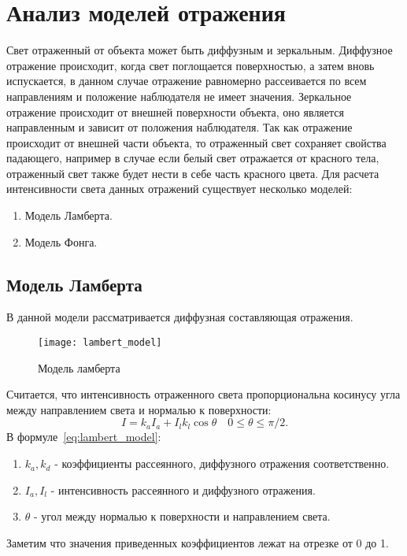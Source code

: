 \section[Анализ моделей отражения]{Анализ моделей отражения}
\label{sec:reflection_models}
Свет отраженный от объекта может быть диффузным и зеркальным.
Диффузное отражение происходит, когда свет поглощается поверхностью, а затем вновь испускается, в данном случае
отражение равномерно рассеивается по всем направлениям и положение наблюдателя не имеет значения. Зеркальное отражение
происходит от внешней поверхности объекта, оно является направленным и зависит от положения наблюдателя.
Так как отражение происходит от внешней части объекта, то отраженный свет сохраняет свойства падающего, например в случае если белый свет отражается
от красного тела, отраженный свет также будет нести в себе часть красного цвета.
Для расчета интенсивности света данных отражений существует несколько моделей:
\begin{enumerate}
	\item Модель Ламберта.
	\item Модель Фонга.\cite{Rodgers}
\end{enumerate}

\subsection{Модель Ламберта}
В данной модели рассматривается диффузная составляющая отражения.

\begin{figure}[h]
	\centering
	\texttt{[image: lambert\_model]}
	\caption{Модель ламберта}
	\label{fig:lambert_model}
\end{figure}

Считается, что интенсивность отраженного света
пропорциональна косинусу угла между направлением света и нормалью к поверхности:
\begin{equation} 
	I = k_aI_a + I_lk_l\cos\theta \quad 0 \leq \theta \leq \pi/2.
	\label{eq:lambert_model}
\end{equation}
В  формуле~\ref{eq:lambert_model}:
\begin{enumerate}
	\item $k_a,k_d$ - коэффициенты рассеянного, диффузного отражения соответственно.
	\item $I_a,I_l$ - интенсивность рассеянного и диффузного отражения.
	\item $\theta$ - угол между нормалью к поверхности и направлением света.
\end{enumerate}
Заметим что значения приведенных коэффициентов лежат на отрезке от 0 до 1.

